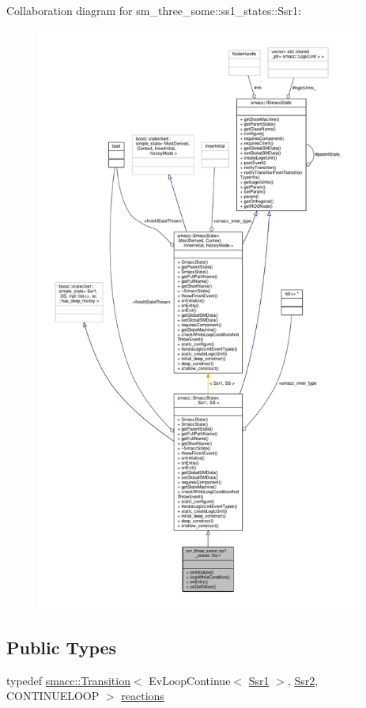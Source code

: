 Collaboration diagram for sm\+\_\+three\+\_\+some\+:\+:ss1\+\_\+states\+:\+:Ssr1\+:\nopagebreak
\begin{figure}[H]
\begin{center}
\leavevmode
\includegraphics[height=550pt]{structsm__three__some_1_1ss1__states_1_1Ssr1__coll__graph}
\end{center}
\end{figure}
\subsection*{Public Types}
\begin{DoxyCompactItemize}
\item 
typedef \hyperlink{classsmacc_1_1Transition}{smacc\+::\+Transition}$<$ Ev\+Loop\+Continue$<$ \hyperlink{structsm__three__some_1_1ss1__states_1_1Ssr1}{Ssr1} $>$, \hyperlink{structsm__three__some_1_1ss1__states_1_1Ssr2}{Ssr2}, C\+O\+N\+T\+I\+N\+U\+E\+L\+O\+OP $>$ \hyperlink{structsm__three__some_1_1ss1__states_1_1Ssr1_a1585ded2cbbefc1883cef0ef4360ebb6}{reactions}
\end{DoxyCompactItemize}
